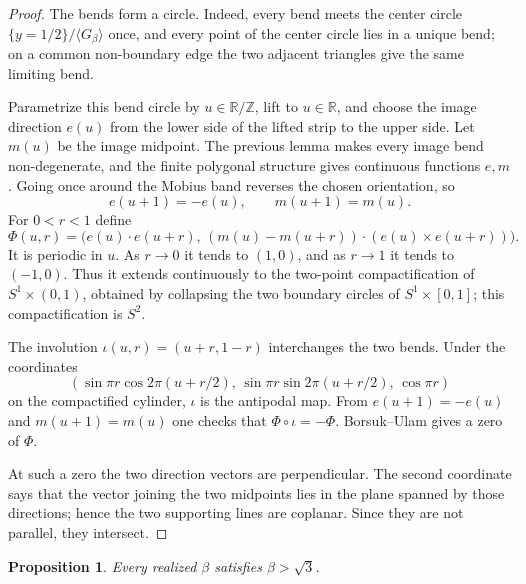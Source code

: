 \documentclass[12pt]{article}
\newtheorem{proposition}{Proposition}
\newcommand{\R}{\mathbb R}
\newcommand{\Z}{\mathbb Z}
\begin{document}
\begin{proof}
The bends form a circle.  Indeed, every bend meets the center circle
\(\{y=1/2\}/\langle G_\beta\rangle\) once, and every point of the center
circle lies in a unique bend; on a common non-boundary edge the two
adjacent triangles give the same limiting bend.

Parametrize this bend circle by \(u\in\R/\Z\), lift to \(u\in\R\), and
choose the image direction \(e(u)\) from the lower side of the lifted
strip to the upper side.  Let \(m(u)\) be the image midpoint.  The
previous lemma makes every image bend non-degenerate, and the finite
polygonal structure gives continuous functions \(e,m\).  Going once
around the Mobius band reverses the chosen orientation, so
\[
        e(u+1)=-e(u),\qquad m(u+1)=m(u).
\]
For \(0<r<1\) define
\[
 \Phi(u,r)=\Big(e(u)\!\cdot e(u+r),\,
 (m(u)-m(u+r))\!\cdot (e(u)\times e(u+r))\Big).
\]
It is periodic in \(u\).  As \(r\to0\) it tends to \((1,0)\), and as
\(r\to1\) it tends to \((-1,0)\).  Thus it extends continuously to the
two-point compactification of \(S^1\times(0,1)\), obtained by collapsing
the two boundary circles of \(S^1\times[0,1]\); this compactification is
\(S^2\).

The involution \(\iota(u,r)=(u+r,1-r)\) interchanges the two bends.  Under
the coordinates
\[
(\sin\pi r\cos 2\pi(u+r/2),\,\sin\pi r\sin 2\pi(u+r/2),\,\cos\pi r)
\]
on the compactified cylinder, \(\iota\) is the antipodal map.  From
\(e(u+1)=-e(u)\) and \(m(u+1)=m(u)\) one checks that
\(\Phi\circ\iota=-\Phi\).  Borsuk--Ulam gives a zero of \(\Phi\).

At such a zero the two direction vectors are perpendicular.  The second
coordinate says that the vector joining the two midpoints lies in the
plane spanned by those directions; hence the two supporting lines are
coplanar.  Since they are not parallel, they intersect.
\end{proof}

\begin{proposition}\label{prop:lower}
Every realized \(\beta\) satisfies \(\beta>\sqrt3\).
\end{proposition}
\end{document}
